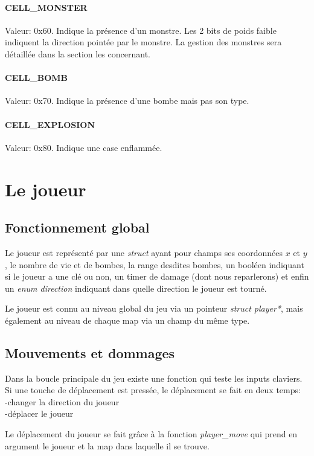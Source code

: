 \documentclass[12pt,a4paper]{article} %
\begin{document}
\paragraph{CELL\_MONSTER} Valeur: 0x60. Indique la présence d'un monstre. Les 2 bits de poids faible indiquent la direction pointée par le monstre.
La gestion des monstres sera détaillée dans la section les concernant.

\paragraph{CELL\_BOMB} Valeur: 0x70. Indique la présence d'une bombe mais pas son type.

\paragraph{CELL\_EXPLOSION} Valeur: 0x80. Indique une case enflammée.

\section{Le joueur}

\subsection{Fonctionnement global}

Le joueur est représenté par une \emph{struct} ayant pour champs ses coordonnées $x$ et $y$, le nombre de vie et de bombes, la range desdites bombes, un booléen indiquant si le joueur a une clé ou non, un timer de damage (dont nous reparlerons) et enfin un \emph{enum direction} indiquant dans quelle direction le joueur est tourné.

Le joueur est connu au niveau global du jeu via un pointeur \emph{struct player*}, mais également au niveau de chaque map via un champ du même type.

\subsection{Mouvements et dommages}

Dans la boucle principale du jeu existe une fonction qui teste les inputs claviers.
Si une touche de déplacement est pressée, le déplacement se fait en deux temps:\\
-changer la direction du joueur\\
-déplacer le joueur

Le déplacement du joueur se fait grâce à la fonction \emph{player\_move} qui prend en argument le joueur et la map dans laquelle il se trouve.
\end{document}
